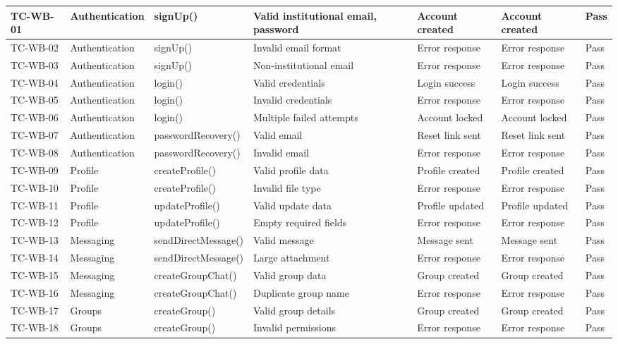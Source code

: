 {\begin{longtable}{|C{1.5cm}|C{2.2cm}|C{3cm}|C{2cm}|C{2cm}|C{2cm}|C{1cm}|}
TC-WB-01 & Authentication & signUp() & Valid institutional email, password & Account created & Account created & Pass \\
\hline
TC-WB-02 & Authentication & signUp() & Invalid email format & Error response & Error response & Pass \\
\hline
TC-WB-03 & Authentication & signUp() & Non-institutional email & Error response & Error response & Pass \\
\hline
TC-WB-04 & Authentication & login() & Valid credentials & Login success & Login success & Pass \\
\hline
TC-WB-05 & Authentication & login() & Invalid credentials & Error response & Error response & Pass \\
\hline
TC-WB-06 & Authentication & login() & Multiple failed attempts & Account locked & Account locked & Pass \\
\hline
TC-WB-07 & Authentication & passwordRecovery() & Valid email & Reset link sent & Reset link sent & Pass \\
\hline
TC-WB-08 & Authentication & passwordRecovery() & Invalid email & Error response & Error response & Pass \\
\hline
TC-WB-09 & Profile & createProfile() & Valid profile data & Profile created & Profile created & Pass \\
\hline
TC-WB-10 & Profile & createProfile() & Invalid file type & Error response & Error response & Pass \\
\hline
TC-WB-11 & Profile & updateProfile() & Valid update data & Profile updated & Profile updated & Pass \\
\hline
TC-WB-12 & Profile & updateProfile() & Empty required fields & Error response & Error response & Pass \\
\hline
TC-WB-13 & Messaging & sendDirectMessage() & Valid message & Message sent & Message sent & Pass \\
\hline
TC-WB-14 & Messaging & sendDirectMessage() & Large attachment & Error response & Error response & Pass \\
\hline
TC-WB-15 & Messaging & createGroupChat() & Valid group data & Group created & Group created & Pass \\
\hline
TC-WB-16 & Messaging & createGroupChat() & Duplicate group name & Error response & Error response & Pass \\
\hline
TC-WB-17 & Groups & createGroup() & Valid group details & Group created & Group created & Pass \\
\hline
TC-WB-18 & Groups & createGroup() & Invalid permissions & Error response & Error response & Pass \\

\end{longtable}}
